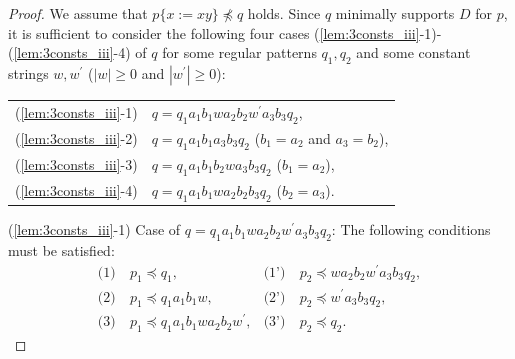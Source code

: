 \begin{proof}
We assume that $p \{ x := xy \} \not\preceq q$ holds.
Since $q$ minimally supports $D$ for $p$,
it is sufficient to consider the following four cases (\ref{lem:3consts_iii}-1)-(\ref{lem:3consts_iii}-4) of $q$ for some regular patterns $q_{1},q_{2}$ and some constant strings $w,w^{\prime}$ ($|w|\geq 0$ and $|w^{\prime}|\geq 0$):

\smallskip

\noindent
\begin{tabular}{ll}
(\ref{lem:3consts_iii}-1) & $q=q_{1}a_{1}b_{1}wa_{2}b_{2}w^{\prime}a_{3}b_{3}q_{2}$,\\
(\ref{lem:3consts_iii}-2) & $q=q_{1}a_{1}b_{1}a_{3}b_{3}q_{2}$ ($b_{1}=a_{2}$ and $a_{3}=b_{2}$),\\
(\ref{lem:3consts_iii}-3) & $q=q_{1}a_{1}b_{1}b_{2}wa_{3}b_{3}q_{2}$ ($b_{1}=a_{2}$),\\
(\ref{lem:3consts_iii}-4) & $q=q_{1}a_{1}b_{1}wa_{2}b_{2}b_{3}q_{2}$ ($b_{2}=a_{3}$).
\end{tabular}

\smallskip

\noindent
(\ref{lem:3consts_iii}-1) Case of $q=q_{1}a_{1}b_{1}wa_{2}b_{2}w^{\prime}a_{3}b_{3}q_{2}$:
The following conditions must be satisfied:
\begin{align*}
\textrm{(1)}~& p_{1} \preceq q_{1}, & \textrm{(1')}~& p_{2} \preceq wa_{2}b_{2}w^{\prime}a_{3}b_{3}q_{2}, \\
\textrm{(2)}~& p_{1} \preceq q_{1}a_{1}b_{1}w, & \textrm{(2')}~& p_{2} \preceq w^{\prime}a_{3}b_{3}q_{2}, \\
\textrm{(3)}~& p_{1} \preceq q_{1}a_{1}b_{1}wa_{2}b_{2}w^{\prime}, & \textrm{(3')}~& p_{2} \preceq q_{2}.
\end{align*}


\end{proof}
